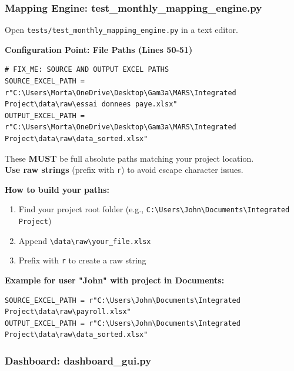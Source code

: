 \documentclass[11pt,a4paper]{article}
\begin{document}
\subsubsection{Mapping Engine: test\_monthly\_mapping\_engine.py}

Open \texttt{tests/test\_monthly\_mapping\_engine.py} in a text editor.

\textbf{Configuration Point: File Paths (Lines 50-51)}

\begin{lstlisting}[style=pythonstyle, caption=Update Absolute Paths]
# FIX_ME: SOURCE AND OUTPUT EXCEL PATHS
SOURCE_EXCEL_PATH = r"C:\Users\Morta\OneDrive\Desktop\Gam3a\MARS\Integrated Project\data\raw\essai donnees paye.xlsx"
OUTPUT_EXCEL_PATH = r"C:\Users\Morta\OneDrive\Desktop\Gam3a\MARS\Integrated Project\data\raw\data_sorted.xlsx"
\end{lstlisting}

\begin{warningbox}[title=Critical: Absolute Paths Required]
These \textbf{MUST} be full absolute paths matching your project location.\\[0.3cm]
\textbf{Use raw strings} (prefix with \texttt{r}) to avoid escape character issues.
\end{warningbox}

\textbf{How to build your paths:}
\begin{enumerate}
    \item Find your project root folder (e.g., \texttt{C:\textbackslash Users\textbackslash John\textbackslash Documents\textbackslash Integrated Project})
    \item Append \texttt{\textbackslash data\textbackslash raw\textbackslash your\_file.xlsx}
    \item Prefix with \texttt{r} to create a raw string
\end{enumerate}

\textbf{Example for user "John" with project in Documents:}
\begin{lstlisting}[style=pythonstyle]
SOURCE_EXCEL_PATH = r"C:\Users\John\Documents\Integrated Project\data\raw\payroll.xlsx"
OUTPUT_EXCEL_PATH = r"C:\Users\John\Documents\Integrated Project\data\raw\data_sorted.xlsx"
\end{lstlisting}

\newpage

\subsubsection{Dashboard: dashboard\_gui.py}
\end{document}
